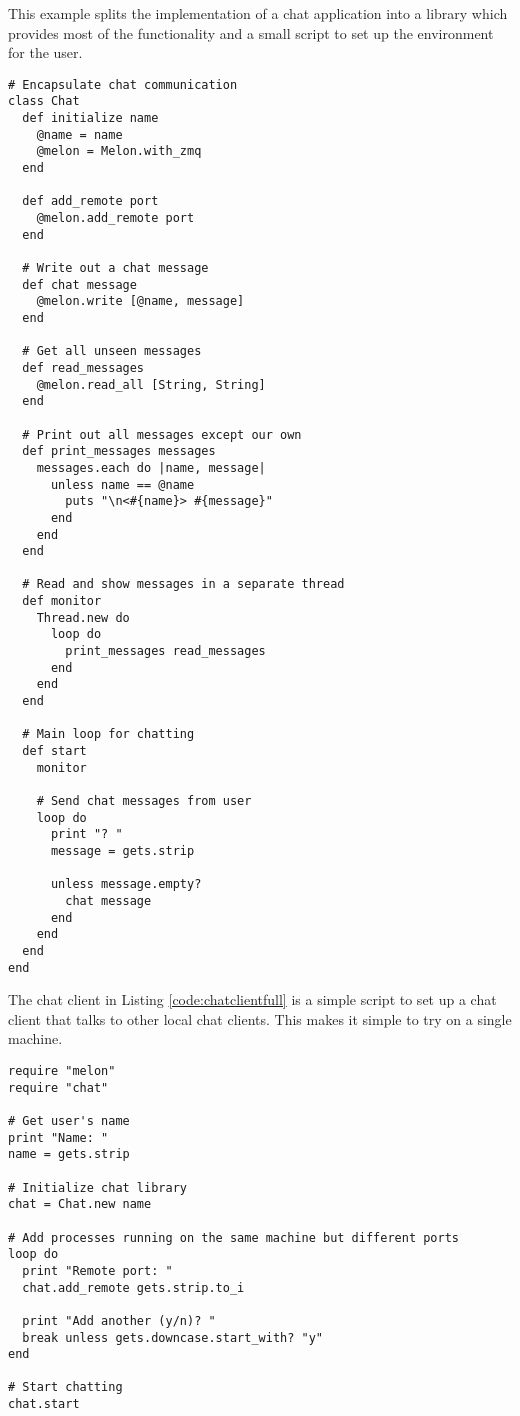This example splits the implementation of a chat application into a library which provides most of the functionality and a small script to set up the environment for the user.

\begin{lstlisting}[caption={Chat Library}, label={code:chatlibfull}]
# Encapsulate chat communication
class Chat
  def initialize name
    @name = name
    @melon = Melon.with_zmq
  end

  def add_remote port
    @melon.add_remote port
  end
  
  # Write out a chat message
  def chat message
    @melon.write [@name, message]
  end

  # Get all unseen messages
  def read_messages
    @melon.read_all [String, String]
  end
 
  # Print out all messages except our own  
  def print_messages messages
    messages.each do |name, message|
      unless name == @name
        puts "\n<#{name}> #{message}"
      end
    end
  end

  # Read and show messages in a separate thread
  def monitor
    Thread.new do
      loop do
        print_messages read_messages
      end
    end
  end

  # Main loop for chatting
  def start
    monitor

    # Send chat messages from user
    loop do
      print "? "
      message = gets.strip

      unless message.empty?
        chat message
      end
    end
  end
end
\end{lstlisting}

The chat client in Listing \ref{code:chatclientfull} is a simple script to set up a chat client that talks to other local chat clients. This makes it simple to try on a single machine.

\begin{lstlisting}[caption={Local Chat Client}, label={code:chatclientfull}]
require "melon"
require "chat"

# Get user's name
print "Name: "
name = gets.strip

# Initialize chat library
chat = Chat.new name

# Add processes running on the same machine but different ports
loop do
  print "Remote port: "
  chat.add_remote gets.strip.to_i

  print "Add another (y/n)? "
  break unless gets.downcase.start_with? "y"
end

# Start chatting
chat.start
\end{lstlisting}